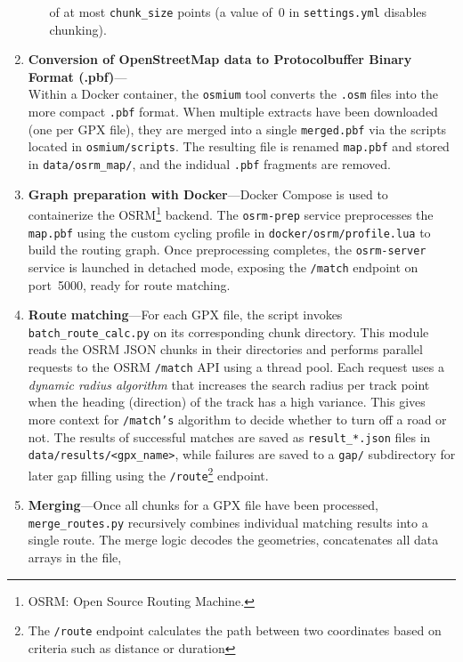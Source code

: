 \documentclass[11pt,a4paper]{article}
\begin{document}
\begin{enumerate}
\begin{itemize}
		            of at most \texttt{chunk\_size} points (a value of~0 in \texttt{settings.yml} disables chunking).
	      \end{itemize}
	\item \textbf{Conversion of OpenStreetMap data to Protocolbuffer Binary Format (.pbf)}---\\Within a Docker container, the \texttt{osmium}
	      tool converts the \texttt{.osm} files into the more compact \texttt{.pbf} format.
	      When multiple extracts have been downloaded (one per GPX file), they are merged into a single \texttt{merged.pbf} via the scripts
	      located in \texttt{osmium/scripts}.
	      The resulting file is renamed \texttt{map.pbf} and stored in \texttt{data/osrm\_map/}, and the indidual \texttt{.pbf} fragments are removed.
	\item \textbf{Graph preparation with Docker}---Docker Compose is used to containerize the OSRM\footnote{OSRM: Open Source Routing Machine.} backend.
	      The \texttt{osrm-prep} service preprocesses the \texttt{map.pbf} using the custom cycling profile in \texttt{docker/osrm/profile.lua}
	      to build the routing graph.  Once preprocessing completes, the \texttt{osrm-server} service is launched in detached mode,
	      exposing the \texttt{/match} endpoint on port~5000, ready for route matching.
	\item \textbf{Route matching}---For each GPX file, the script invokes \texttt{batch\_route\_calc.py} on its
	      corresponding chunk directory.  This module reads the OSRM JSON chunks in their directories and performs parallel requests to the OSRM
	      \texttt{/match} API using a thread pool.  Each request uses a \emph{dynamic radius algorithm} that increases the search radius per track point
	      when the heading (direction) of the track has a high variance. This gives more context for \texttt{/match's} algorithm to decide whether to turn off a road or not.
	      The results of successful matches are saved as \texttt{result\_*.json} files in \texttt{data/results/\textless gpx\_name\textgreater{}},
	      while failures are saved to a \texttt{gap/} subdirectory for later gap filling using the \texttt{/route}\footnote{The \texttt{/route}
		      endpoint calculates the path between two coordinates based on criteria such as distance or duration} endpoint.
	\item \textbf{Merging}---Once all chunks for a GPX file have been processed, \texttt{merge\_routes.py} recursively combines
	      individual matching results into a single route.  The merge logic decodes the geometries, concatenates all data arrays in the file,

\end{enumerate}
\end{document}
